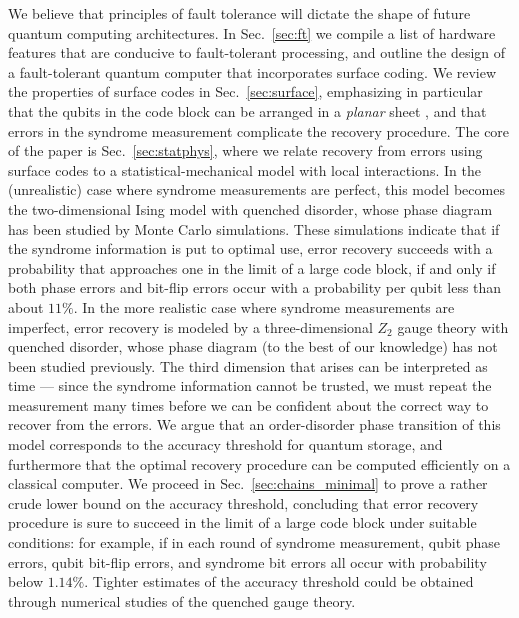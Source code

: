 We believe that principles of fault tolerance will dictate the shape of future quantum computing architectures. In  Sec.~\ref{sec:ft} we compile a list of hardware features that are conducive to fault-tolerant processing, and outline the design of a fault-tolerant quantum computer that incorporates surface coding. We review the properties of surface codes in Sec.~\ref{sec:surface}, emphasizing in particular that the qubits in the code block can be arranged in a {\em planar} sheet \cite{brav_kit,freed_meyer}, and that errors in the syndrome measurement complicate the recovery procedure.  The core of the paper is Sec.~\ref{sec:statphys}, where we relate recovery from errors using surface codes to a statistical-mechanical model with local interactions. In the (unrealistic) case where syndrome measurements are perfect, this model becomes the two-dimensional Ising model with quenched disorder, whose phase diagram has been studied by Monte Carlo simulations. These simulations indicate that if the syndrome information is put to optimal use, error recovery succeeds with a probability that approaches one in the limit of a large code block, if and only if both phase errors and bit-flip errors occur with a probability per qubit less than about $11\%$. In the more realistic case where syndrome measurements are imperfect, error recovery is modeled by a three-dimensional $Z_2$ gauge theory with quenched disorder, whose phase diagram (to the best of our knowledge) has not been studied previously. The third dimension that arises can be interpreted as time --- since the syndrome information cannot be trusted, we must repeat the measurement many times before we can be confident about the correct way to recover from the errors. We argue that an order-disorder phase transition of this model corresponds to the accuracy threshold for quantum storage, and furthermore that the optimal recovery procedure can be computed efficiently on a classical computer. We proceed in Sec.~\ref{sec:chains_minimal} to prove a rather crude lower bound on the accuracy threshold, concluding that error recovery procedure is sure to succeed in the limit of a large code block under suitable conditions: for example, if in each round of syndrome measurement, qubit phase errors, qubit bit-flip errors, and syndrome bit errors all occur with probability below $1.14\%$. Tighter estimates of the accuracy threshold could be obtained through numerical studies of the quenched gauge theory. 

